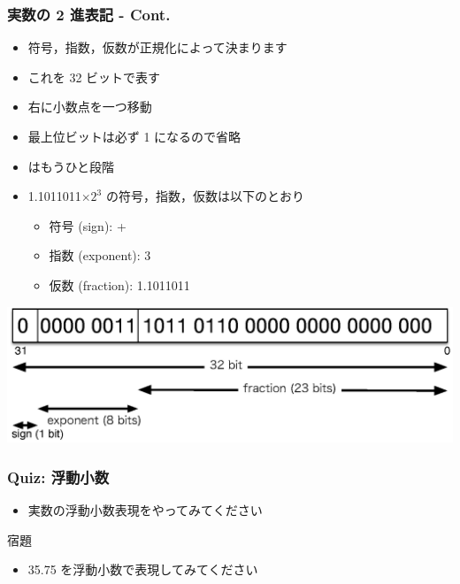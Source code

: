 \begin{frame}[shrink]
\frametitle{実数の 2 進表記 - Cont.}
  \begin{itemize}
\item 符号，指数，仮数が正規化によって決まります
\item これを 32 ビットで表す
\item 右に小数点を一つ移動
\item 最上位ビットは必ず 1 になるので省略
\item \href{http://ieeexplore.ieee.org/xpl/mostRecentIssue.jsp?punumber=2355}{}はもうひと段階
  \end{itemize}
  \begin{center}
    \begin{example}
      \begin{itemize}
\item 1.1011011\(\times 2^3\) の符号，指数，仮数は以下のとおり
        \begin{itemize}
\item 符号 (sign): +
\item 指数 (exponent): 3
\item 仮数 (fraction): 1.1011011
        \end{itemize}
      \end{itemize}
    \end{example}
\includegraphics[scale=.4]{./Figure/elementaryCS-figFloatingPointFormat.eps}
  \end{center}
\end{frame}
\begin{frame}
\frametitle{Quiz: 浮動小数}
  \begin{itemize}
\item 実数の浮動小数表現をやってみてください
  \end{itemize}
  \begin{block}{宿題}
    \begin{itemize}
\item 35.75 を浮動小数で表現してみてください
    \end{itemize}
  \end{block}
\end{frame}

